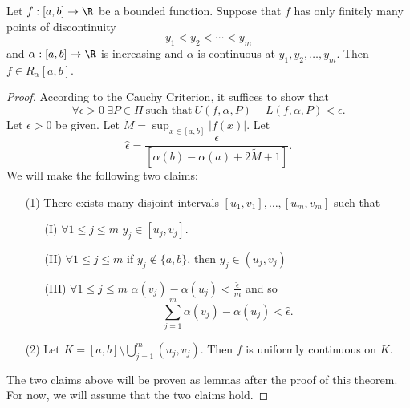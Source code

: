 \begin{theorem}[Rudin 6.10]\label{Rudin 6.10}
    Let \( f: [a,b] \to \R  \) be a bounded function. Suppose that \( f  \) has only finitely many points of discontinuity  
    \[  {y}_{1} < {y}_{2} < \cdots < {y}_{m}  \]
    and \( \alpha:[a,b] \to \R \) is increasing and \( \alpha \) is continuous at \( {y}_{1}, {y}_{2}, \dots, {y}_{m} \). Then \( f \in {R}_{\alpha}[a,b] \).
\end{theorem}
\begin{proof}
According to the Cauchy Criterion, it suffices to show that
\[  \forall \epsilon > 0 \ \exists P \in \Pi \ \text{such that} \ U(f,\alpha,P) - L(f,\alpha,P) < \epsilon. \]
Let \( \epsilon > 0 \) be given. Let \( \tilde{M} = \sup_{x \in [a,b]} | f(x) |  \). Let 
\[  \hat{\epsilon} = \frac{ \epsilon }{ [\alpha(b) - \alpha(a) + 2 \tilde{M} + 1] }.  \]
We will make the following two claims:
\begin{enumerate}
    \item[(1)] There exists many disjoint intervals \( [{u}_{1}, {v}_{1}] , \dots, [{u}_{m}, {v}_{m}] \) such that 
        \begin{enumerate}
            \item[(I)] \( \forall 1 \leq j \leq m  \) \( {y}_{j} \in [{u}_{j}, {v}_{j}] \).
            \item[(II)] \( \forall 1 \leq j \leq m  \) if \( {y}_{j} \notin \{ a,b \}  \), then \( {y}_{j} \in ({u}_{j}, {v}_{j}) \)
            \item[(III)] \( \forall 1 \leq j \leq m  \) \( \alpha({v}_{j}) - \alpha({u}_{j}) < \frac{ \hat{\epsilon} }{ m }  \) and so
                \[  \sum_{ j=1  }^{ m } \alpha({v}_{j}) - \alpha({u}_{j}) < \hat{\epsilon}. \]
        \end{enumerate}
    \item[(2)] Let \( K = [a,b] \setminus  \bigcup_{ j=1  }^{ m  }  ({u}_{j}, {v}_{j}) \). Then \( f  \) is uniformly continuous on \( K  \).
\end{enumerate}
The two claims above will be proven as lemmas after the proof of this theorem. For now, we will assume that the two claims hold.


\end{proof}
